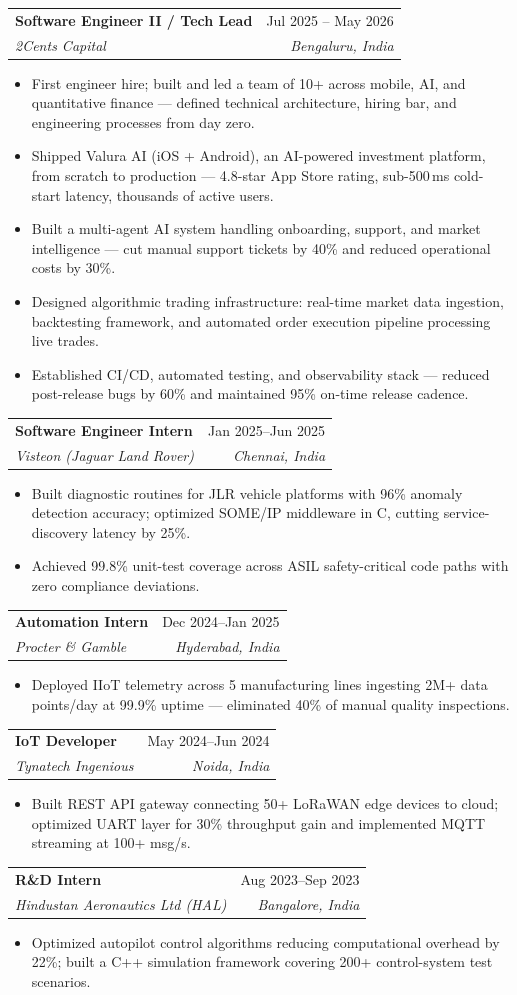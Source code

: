 \documentclass[letterpaper,11pt]{article}
\makeatletter
\newcommand{\resumeItem}[1]{\item\small{{#1 \vspace{-2pt}}}}
\newcommand{\resumeSubheading}[4]{
  \vspace{-2pt}\item
    \begin{tabular*}{0.97\textwidth}[t]{l@{\extracolsep{\fill}}r}
      \textbf{#1} & #2 \\
      \textit{\small#3} & \textit{\small #4} \\
    \end{tabular*}\vspace{-7pt}
}
\newcommand{\resumeItemListStart}{\begin{itemize}}
\newcommand{\resumeItemListEnd}{\end{itemize}\vspace{-5pt}}
\makeatother
\begin{document}
\resumeSubheading
  {Software Engineer II / Tech Lead}{Jul 2025 -- May 2026}
  {2Cents Capital}{Bengaluru, India}
  \resumeItemListStart
    \resumeItem{First engineer hire; built and led a team of 10+ across mobile, AI, and quantitative finance --- defined technical architecture, hiring bar, and engineering processes from day zero.}
    \resumeItem{Shipped Valura AI (iOS + Android), an AI-powered investment platform, from scratch to production --- 4.8-star App Store rating, sub-500\,ms cold-start latency, thousands of active users.}
    \resumeItem{Built a multi-agent AI system handling onboarding, support, and market intelligence --- cut manual support tickets by 40\% and reduced operational costs by 30\%.}
    \resumeItem{Designed algorithmic trading infrastructure: real-time market data ingestion, backtesting framework, and automated order execution pipeline processing live trades.}
    \resumeItem{Established CI/CD, automated testing, and observability stack --- reduced post-release bugs by 60\% and maintained 95\% on-time release cadence.}
  \resumeItemListEnd

  \resumeSubheading
    {Software Engineer Intern}{Jan 2025--Jun 2025}
    {Visteon (Jaguar Land Rover)}{Chennai, India}
    \resumeItemListStart
      \resumeItem{Built diagnostic routines for JLR vehicle platforms with 96\% anomaly detection accuracy; optimized SOME/IP middleware in C, cutting service-discovery latency by 25\%.}
      \resumeItem{Achieved 99.8\% unit-test coverage across ASIL safety-critical code paths with zero compliance deviations.}
    \resumeItemListEnd

  \resumeSubheading
    {Automation Intern}{Dec 2024--Jan 2025}
    {Procter \& Gamble}{Hyderabad, India}
    \resumeItemListStart
      \resumeItem{Deployed IIoT telemetry across 5 manufacturing lines ingesting 2M+ data points/day at 99.9\% uptime --- eliminated 40\% of manual quality inspections.}
    \resumeItemListEnd

  \resumeSubheading
    {IoT Developer}{May 2024--Jun 2024}
    {Tynatech Ingenious}{Noida, India}
    \resumeItemListStart
      \resumeItem{Built REST API gateway connecting 50+ LoRaWAN edge devices to cloud; optimized UART layer for 30\% throughput gain and implemented MQTT streaming at 100+ msg/s.}
    \resumeItemListEnd

  \resumeSubheading
    {R\&D Intern}{Aug 2023--Sep 2023}
    {Hindustan Aeronautics Ltd (HAL)}{Bangalore, India}
    \resumeItemListStart
      \resumeItem{Optimized autopilot control algorithms reducing computational overhead by 22\%; built a C++ simulation framework covering 200+ control-system test scenarios.}
    \resumeItemListEnd
\end{document}
